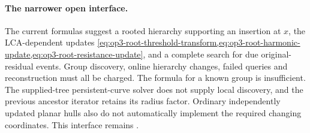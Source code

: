 \paragraph{The narrower open interface.}
The current formulas suggest a rooted hierarchy supporting an insertion at
$x$, the LCA-dependent updates
\cref{eq:op3-root-threshold-transform,eq:op3-root-harmonic-update,eq:op3-root-resistance-update},
and a complete search for due original-residual events. Group discovery,
online hierarchy changes, failed queries and reconstruction must all be
charged. The formula for a known group is insufficient. The supplied-tree
persistent-curve solver does not supply local discovery, and the previous
ancestor iterator retains its radius factor. Ordinary independently updated
planar hulls also do not automatically implement the required changing
coordinates. This interface remains \statusopen.
